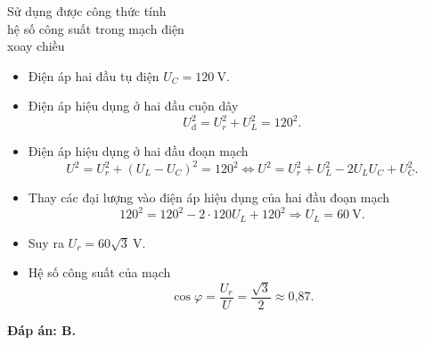 \begin{dang}{Sử dụng được công thức tính \\ hệ số công suất trong mạch điện \\ xoay chiều}
{		\begin{itemize}
			\item Điện áp hai đầu tụ điện $U_C=120\ \text{V}$.
			\item Điện áp hiệu dụng ở hai đầu cuộn dây
			\begin{equation*}
				U^2_{\text{d}}=U^2_r+U^2_L =120^2.
			\end{equation*}
			\item Điện áp hiệu dụng ở hai đầu đoạn mạch
			\begin{equation*}
				U^2=U^2_r+(U_L-U_C)^2=120^2 \Leftrightarrow U^2=U^2_r + U^2_L -2U_LU_C +U^2_C.
			\end{equation*}
			\item Thay các đại lượng vào điện áp hiệu dụng của hai đầu đoạn mạch
			\begin{equation*}
				120^2=120^2-2\cdot 120 U_L + 120^2 \Rightarrow U_L=60\ \text{V}.
			\end{equation*}
			\item Suy ra $U_r=60\sqrt 3\ \text{V}$.
			\item Hệ số công suất của mạch
			\begin{equation*}
				\cos \varphi =\dfrac{U_r}{U}=\dfrac{\sqrt 3}{2} \approx \text{0,87}.
			\end{equation*}
		\end{itemize}
		
		\textbf{Đáp án: B.}
	}
	
\end{dang}
